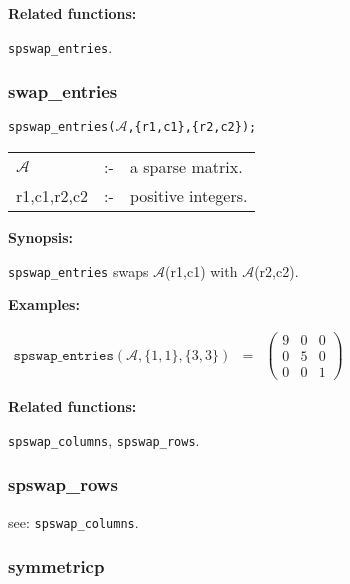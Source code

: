 \textbf{Related functions:}

\hspace*{0.175in} \texttt{spswap\_entries}.


\subsubsection{swap\_entries}

\hspace*{0.175in} \texttt{spswap\_entries($\mathcal{A}$,\{r1,c1\},\{r2,c2\});}

\hspace*{0.1in}  
\begin{tabular}{l l l} 
$\mathcal{A}$  &:-& a sparse matrix. \\
r1,c1,r2,c2 &:-& positive integers.
\end{tabular}

\textbf{Synopsis:} 

\hspace*{0.175in} \texttt{spswap\_entries} swaps $\mathcal{A}$(r1,c1) with 
                $\mathcal{A}$(r2,c2).

\textbf{Examples:}

\begin{flushleft}  
\hspace*{0.1in}
\begin{math}  
\begin{array}{ccc}
\texttt{spswap\_entries}(\mathcal{A},\{1,1\},\{3,3\}) & = & 
        \left( \begin{array}{ccc} 9 & 0 & 0 \\ 0 & 5 & 0 \\ 0 & 0 & 1
 \end{array} \right) 
\end{array}
\end{math}  
\end{flushleft}

\textbf{Related functions:}

\hspace*{0.175in} \texttt{spswap\_columns}, \texttt{spswap\_rows}.


\subsubsection{spswap\_rows}

\hspace*{0.175in} see: \texttt{spswap\_columns}.


\subsubsection{symmetricp}

